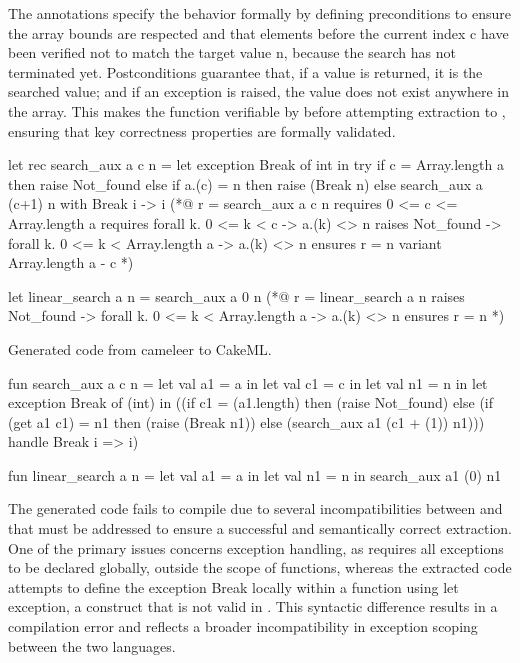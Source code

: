 The \gospel annotations specify the behavior formally by defining preconditions to ensure the array bounds are respected
and that elements before the current index c have been verified not to match the target value n, because the search has not terminated yet. 
Postconditions guarantee that, if a value is returned, it is the searched value; and if an exception  is raised, 
the value does not exist anywhere in the array. This makes the function verifiable by \whythree before attempting extraction to \cml, ensuring 
that key correctness properties are formally validated.

\begin{gospell}
let rec search_aux a c n =
    let exception Break of int in try
        if c = Array.length a then raise Not_found else if a.(c) = n 
        then raise (Break n) else search_aux a (c+1) n
    with Break i -> i
(*@
    r = search_aux a c n
    requires 0 <= c <= Array.length a
    requires forall k. 0 <= k < c -> a.(k) <> n
    raises Not_found -> forall k. 0 <= k < Array.length a -> a.(k) <> n
    ensures r = n
    variant Array.length a - c
*)

let linear_search a n = search_aux a 0 n
(*@
    r = linear_search a n
    raises Not_found -> forall k. 0 <= k < Array.length a -> a.(k) <> n
    ensures r = n
*)
\end{gospell}

Generated code from cameleer to CakeML.

\begin{cakeml}
fun search_aux a c n = let val a1 = a in
  let val c1 = c in
  let val n1 = n in
  let exception Break of (int) in
  ((if c1 = (a1.length) then (raise Not_found) 
    else (if (get a1 c1) = n1 then (raise (Break n1)) 
          else (search_aux a1 (c1 + (1)) n1)))
  handle   Break i => i)

fun linear_search a n =
  let val a1 = a in let val n1 = n in search_aux a1 (0) n1
\end{cakeml}

The generated \cml code fails to compile due to several incompatibilities between \ocaml and \cml that must be addressed 
to ensure a successful and semantically correct extraction. One of the primary issues concerns exception handling, as \cml 
requires all exceptions to be declared globally, outside the scope of functions, whereas the extracted code attempts to define 
the exception Break locally within a function using let exception, a construct that is not valid in \cml. This syntactic 
difference results in a compilation error and reflects a broader incompatibility in exception scoping between the two languages.

